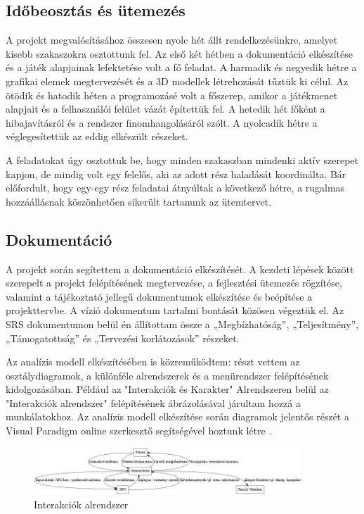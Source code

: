 \documentclass[12pt,a4paper]{article}
\begin{document}
\subsection{Időbeosztás és ütemezés}

A projekt megvalósításához összesen nyolc hét állt rendelkezésünkre, amelyet kisebb szakaszokra osztottunk fel. Az első két hétben a dokumentáció elkészítése és a játék alapjainak lefektetése volt a fő feladat. A harmadik és negyedik hétre a grafikai elemek megtervezését és a 3D modellek létrehozását tűztük ki célul. Az ötödik és hatodik héten a programozásé volt a főszerep, amikor a játékmenet alapjait és a felhasználói felület vázát építettük fel. A hetedik hét főként a hibajavításról és a rendszer finomhangolásáról szólt. A nyolcadik hétre a véglegesítettük az eddig elkészült részeket.

A feladatokat úgy osztottuk be, hogy minden szakaszban mindenki aktív szerepet kapjon, de mindig volt egy felelős, aki az adott rész haladását koordinálta. Bár előfordult, hogy egy-egy rész feladatai átnyúltak a következő hétre, a rugalmas hozzáállásnak köszönhetően sikerült tartanunk az ütemtervet.

\subsection{Dokumentáció}
A projekt során segítettem a dokumentáció elkészítését. A kezdeti lépések között szerepelt a projekt felépítésének megtervezése, a fejlesztési ütemezés rögzítése, valamint a tájékoztató jellegű dokumentumok elkészítése és beépítése a projekttervbe. A vízió dokumentum tartalmi bontását közösen végeztük el. Az SRS dokumentumon belül én állítottam össze a „Megbízhatóság”, „Teljesítmény”, „Támogatottság” és „Tervezési korlátozások” részeket.

Az analízis modell elkészítésében is közreműködtem: részt vettem az osztálydiagramok, a különféle alrendszerek és a menürendszer felépítésének kidolgozásában. Például az "Interakciók és Karakter" Alrendszeren belül az "Interakciók alrendszer" felépítésének ábrázolásával járultam hozzá a munkálatokhoz. Az analízis modell elkészítése során diagramok jelentős részét a Visual Paradigm online szerkesztő segítségével hoztunk létre \cite{visual_paradigm}.

\begin{figure}[h]
    \centering
    \includegraphics[width=0.9\textwidth]{images/interactions_dynamic.png}
    \caption{Interakciók alrendszer}
    \label{fig:classdia}
\end{figure}
\end{document}

